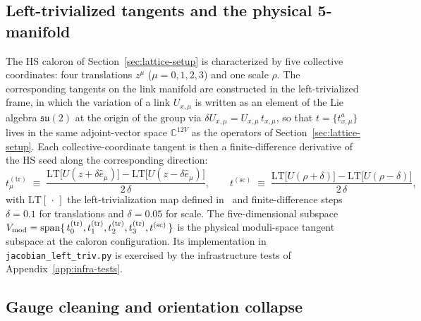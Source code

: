 \documentclass[a4paper,11pt]{article}
\theoremstyle{definition}
\begin{document}
\subsection{Left-trivialized tangents and the physical 5-manifold}
\label{subsec:jacobian-LT}

The HS caloron of Section~\ref{sec:lattice-setup} is characterized by
five collective coordinates: four translations $z^\mu$ ($\mu=0,1,2,3$)
and one scale $\rho$. The corresponding tangents on the link manifold
are constructed in the left-trivialized frame, in which the variation
of a link $U_{x,\mu}$ is written as an element of the Lie algebra
$\mathfrak{su}(2)$ at the origin of the group via
$\delta U_{x,\mu} = U_{x,\mu}\,t_{x,\mu}$, so that
$t = \{t_{x,\mu}^a\}$ lives in the same adjoint-vector space
$\mathbb{C}^{12V}$ as the operators of
Section~\ref{sec:lattice-setup}. Each collective-coordinate tangent is
then a finite-difference derivative of the HS seed along the
corresponding direction:
\begin{equation}
t_\mu^{(\text{tr})}
\;\equiv\;
\frac{\mathrm{LT}\bigl[U(z+\delta\hat{e}_\mu)\bigr]
      - \mathrm{LT}\bigl[U(z-\delta\hat{e}_\mu)\bigr]}
     {2\,\delta},
\qquad
t^{(\text{sc})}
\;\equiv\;
\frac{\mathrm{LT}\bigl[U(\rho+\delta)\bigr]
      - \mathrm{LT}\bigl[U(\rho-\delta)\bigr]}
     {2\,\delta},
\label{eq:LT-tangents}
\end{equation}
with $\mathrm{LT}[\,\cdot\,]$ the left-trivialization map defined
in~\cite{companion-structural} and finite-difference steps
$\delta = 0.1$ for translations and $\delta = 0.05$ for scale. The
five-dimensional subspace
$V_{\rm mod} = \mathrm{span}\{\,t_0^{(\text{tr})},t_1^{(\text{tr})},
t_2^{(\text{tr})},t_3^{(\text{tr})},t^{(\text{sc})}\,\}$ is the
physical moduli-space tangent subspace at the caloron configuration.
Its implementation in \texttt{jacobian\_left\_triv.py} is exercised by
the infrastructure tests of Appendix~\ref{app:infra-tests}.

\subsection{Gauge cleaning and orientation collapse}
\label{subsec:jacobian-gauge-cleaning}
\end{document}

